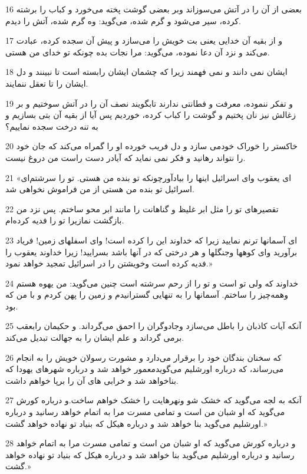 \par 16 بعضی از آن را در آتش می‌سوزاند وبر بعضی گوشت پخته می‌خورد و کباب را برشته کرده، سیر می‌شود و گرم شده، می‌گوید: وه گرم شده، آتش را دیدم.
\par 17 و از بقیه آن خدایی یعنی بت خویش را می‌سازد و پیش آن سجده کرده، عبادت می‌کند و نزد آن دعا نموده، می‌گوید: مرا نجات بده چونکه تو خدای من هستی.
\par 18 ایشان نمی دانند و نمی فهمند زیرا که چشمان ایشان رابسته است تا نبینند و دل ایشان را تا تعقل ننمایند.
\par 19 و تفکر ننموده، معرفت و فطانتی ندارند تابگویند نصف آن را در آتش سوختیم و بر زغالش نیز نان پختیم و گوشت را کباب کرده، خوردیم پس آیا از بقیه آن بتی بسازیم و به تنه درخت سجده نماییم؟
\par 20 خاکستر را خوراک خودمی سازد و دل فریب خورده او را گمراه می‌کند که جان خود را نتواند رهانید و فکر نمی نماید که آیادر دست راست من دروغ نیست.
\par 21 «ای یعقوب و‌ای اسرائیل اینها را بیادآورچونکه تو بنده من هستی. تو را سرشتم‌ای اسرائیل تو بنده من هستی از من فراموش نخواهی شد.
\par 22 تقصیرهای تو را مثل ابر غلیظ و گناهانت را مانند ابر محو ساختم. پس نزد من بازگشت نمازیرا تو را فدیه کرده‌ام.
\par 23 ‌ای آسمانها ترنم نمایید زیرا که خداوند این را کرده است! و‌ای اسفلهای زمین! فریاد برآورید و‌ای کوهها وجنگلها و هر درختی که در آنها باشد بسرایید! زیرا خداوند یعقوب را فدیه کرده است وخویشتن را در اسرائیل تمجید خواهد نمود.»
\par 24 خداوند که ولی تو است و تو را از رحم سرشته است چنین می‌گوید: من یهوه هستم وهمه‌چیز را ساختم. آسمانها را به تنهایی گسترانیدم و زمین را پهن کردم و با من که بود.
\par 25 آنکه آیات کاذبان را باطل می‌سازد وجادوگران را احمق می‌گرداند. و حکیمان رابعقب برمی گرداند و علم ایشان را به جهالت تبدیل می‌کند.
\par 26 که سخنان بندگان خود را برقرار می‌دارد و مشورت رسولان خویش را به انجام می‌رساند، که درباره اورشلیم می‌گویدمعمور خواهد شد و درباره شهرهای یهودا که بناخواهد شد و خرابی های آن را برپا خواهم داشت.
\par 27 آنکه به لجه می‌گوید که خشک شو ونهرهایت را خشک خواهم ساخت.و درباره کورش می‌گوید که او شبان من است و تمامی مسرت مرا به اتمام خواهد رسانید و درباره اورشلیم می‌گوید بنا خواهد شد و درباره هیکل که بنیاد تو نهاده خواهد گشت.»
\par 28 و درباره کورش می‌گوید که او شبان من است و تمامی مسرت مرا به اتمام خواهد رسانید و درباره اورشلیم می‌گوید بنا خواهد شد و درباره هیکل که بنیاد تو نهاده خواهد گشت.»
 
